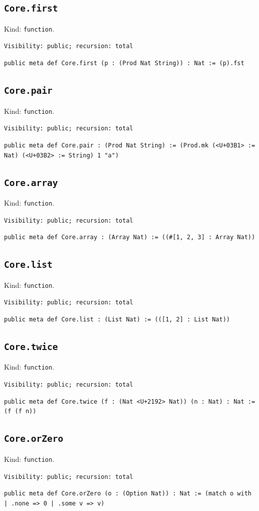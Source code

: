 \documentclass[11pt]{article}
\begin{document}
\subsection*{\texttt{Core.first}}
\noindent Kind: \texttt{function}.\par
\noindent \texttt{Visibility: public; recursion: total}\par
\noindent \texttt{public meta def Core.first (p : (Prod Nat String)) : Nat :=   (p).fst}\par
\subsection*{\texttt{Core.pair}}
\noindent Kind: \texttt{function}.\par
\noindent \texttt{Visibility: public; recursion: total}\par
\noindent \texttt{public meta def Core.pair : (Prod Nat String) :=   (Prod.mk (<U+03B1> := Nat) (<U+03B2> := String) 1 "a")}\par
\subsection*{\texttt{Core.array}}
\noindent Kind: \texttt{function}.\par
\noindent \texttt{Visibility: public; recursion: total}\par
\noindent \texttt{public meta def Core.array : (Array Nat) :=   ((\#[1, 2, 3] : Array Nat))}\par
\subsection*{\texttt{Core.list}}
\noindent Kind: \texttt{function}.\par
\noindent \texttt{Visibility: public; recursion: total}\par
\noindent \texttt{public meta def Core.list : (List Nat) :=   (([1, 2] : List Nat))}\par
\subsection*{\texttt{Core.twice}}
\noindent Kind: \texttt{function}.\par
\noindent \texttt{Visibility: public; recursion: total}\par
\noindent \texttt{public meta def Core.twice (f : (Nat <U+2192> Nat)) (n : Nat) : Nat :=   (f (f n))}\par
\subsection*{\texttt{Core.orZero}}
\noindent Kind: \texttt{function}.\par
\noindent \texttt{Visibility: public; recursion: total}\par
\noindent \texttt{public meta def Core.orZero (o : (Option Nat)) : Nat :=   (match o with | .none => 0 | .some v => v)}\par
\end{document}
